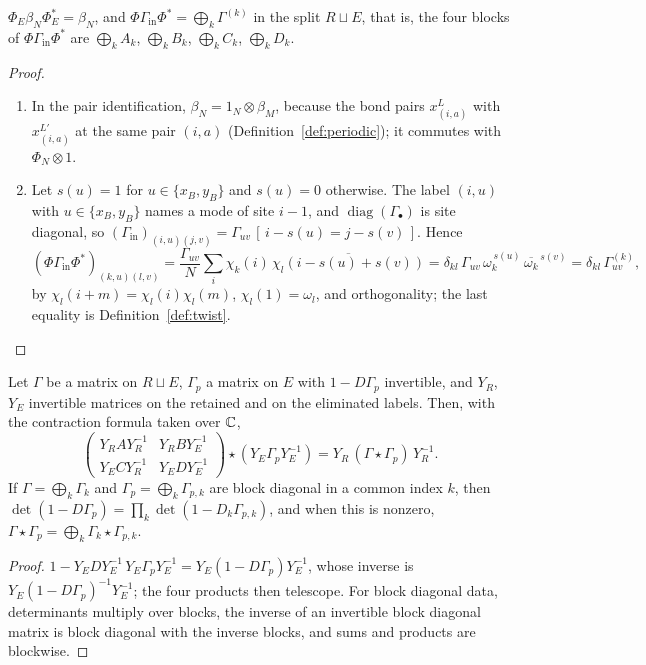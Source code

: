 \begin{lemma}\label{lem:input-blocks}
$\Phi_E\beta_N\Phi_E^*=\beta_N$, and $\Phi\Gamma_{\mathrm{in}}\Phi^*=\bigoplus_{k}\Gamma^{(k)}$ in the
split $R\sqcup E$, that is, the four blocks of $\Phi\Gamma_{\mathrm{in}}\Phi^*$ are
$\bigoplus_kA_k$, $\bigoplus_kB_k$, $\bigoplus_kC_k$, $\bigoplus_kD_k$.
\end{lemma}
\begin{proof}
\begin{enumerate}
\item[(a)] In the pair identification, $\beta_N=1_N\otimes\beta_M$, because the bond
pairs $x^{L}_{(i,a)}$ with $x^{L'}_{(i,a)}$ at the same pair $(i,a)$
(Definition~\ref{def:periodic}); it commutes with $\Phi_N\otimes1$.
\item[(b)] Let $s(u)=1$ for $u\in\{x_B,y_B\}$ and $s(u)=0$ otherwise. The label $(i,u)$
with $u\in\{x_B,y_B\}$ names a mode of site $i-1$, and $\operatorname{diag}(\Gamma_\bullet)$
is site diagonal, so
$(\Gamma_{\mathrm{in}})_{(i,u)(j,v)}=\Gamma_{uv}\,[\,i-s(u)=j-s(v)\,]$. Hence
\[
 (\Phi\Gamma_{\mathrm{in}}\Phi^*)_{(k,u)(l,v)}
 =\frac{\Gamma_{uv}}N\sum_{i}\chi_k(i)\,\overline{\chi_l(i-s(u)+s(v))}
 =\delta_{kl}\,\Gamma_{uv}\,\omega_k^{\,s(u)}\,\overline{\omega_k}^{\,s(v)}
 =\delta_{kl}\,\Gamma^{(k)}_{uv},
\]
by $\chi_l(i+m)=\chi_l(i)\chi_l(m)$, $\chi_l(1)=\omega_l$, and orthogonality; the last
equality is Definition~\ref{def:twist}. \qedhere
\end{enumerate}
\end{proof}

\begin{lemma}\label{lem:contract-conj}
Let $\Gamma$ be a matrix on $R\sqcup E$, $\Gamma_p$ a matrix on $E$ with $1-D\Gamma_p$
invertible, and $Y_R$, $Y_E$ invertible matrices on the retained and on the eliminated
labels. Then, with the contraction formula taken over $\mathbb C$,
\[
 \begin{pmatrix}Y_RAY_R^{-1}&Y_RBY_E^{-1}\\Y_ECY_R^{-1}&Y_EDY_E^{-1}\end{pmatrix}\star(Y_E\Gamma_pY_E^{-1})
 =Y_R\,(\Gamma\star\Gamma_p)\,Y_R^{-1} .
\]
If $\Gamma=\bigoplus_k\Gamma_k$ and $\Gamma_p=\bigoplus_k\Gamma_{p,k}$ are block diagonal
in a common index $k$, then $\det(1-D\Gamma_p)=\prod_k\det(1-D_k\Gamma_{p,k})$, and when
this is nonzero, $\Gamma\star\Gamma_p=\bigoplus_k\Gamma_k\star\Gamma_{p,k}$.
\end{lemma}
\begin{proof}
$1-Y_EDY_E^{-1}\,Y_E\Gamma_pY_E^{-1}=Y_E(1-D\Gamma_p)Y_E^{-1}$, whose inverse is
$Y_E(1-D\Gamma_p)^{-1}Y_E^{-1}$; the four products then telescope. For block
diagonal data, determinants multiply over blocks, the inverse of an invertible block
diagonal matrix is block diagonal with the inverse blocks, and sums and products are
blockwise.
\end{proof}

